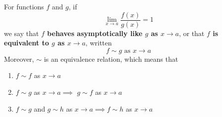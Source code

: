 \documentclass{article}
\begin{document}
    \begin{definition}
      For functions $f$ and $g$, if 
      \[\lim_{x \rightarrow a} \frac{f(x)}{g(x)} = 1\]
      we say that \textbf{$f$ behaves asymptotically like $g$ as $x \rightarrow a$}, or that \textbf{$f$ is equivalent to $g$ as $x \rightarrow a$}, written 
      \[f \sim g \text{ as } x \rightarrow a\]
      Moreover, $\sim$ is an equivalence relation, which means that
      \begin{enumerate}
        \item $f \sim f$ as $x \rightarrow a$
        \item $f \sim g$ as $x \rightarrow a \implies$ $g \sim f$ as $x \rightarrow a$
        \item $f \sim g$ and $g \sim h$ as $x \rightarrow a \implies f \sim h$ as $x \rightarrow a$
      \end{enumerate}
    \end{definition}
\end{document}
